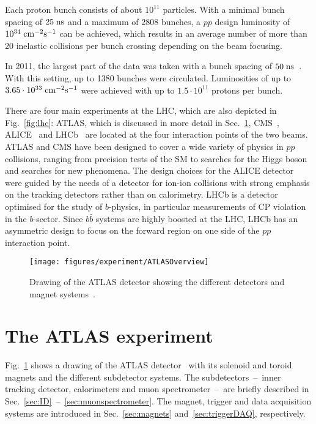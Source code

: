 Each proton bunch consists of about $10^{11}$ particles.
With a minimal bunch spacing of \mbox{$25 \; \mathrm{ns}$} and a maximum of 2808 bunches, a $pp$ design luminosity of \mbox{$10^{34}\; \mathrm{cm}^{-2}\mathrm{s}^{-1}$} can be achieved, 
which results in an average number of more than 20 inelastic collisions per bunch crossing depending on the beam focusing.

In 2011, the largest part of the data was taken with a bunch spacing of \mbox{$50 \; \mathrm{ns}$}~\cite{fournier}.
With this setting, up to 1380 bunches were circulated.
Luminosities of up to \mbox{$3.65 \cdot 10^{33} \; \mathrm{cm}^{-2}\mathrm{s}^{-1}$} were achieved with up to $1.5 \cdot 10^{11}$ protons per bunch.

There are four main experiments at the LHC, which are also depicted in Fig.~\ref{fig:lhc}:
ATLAS, which is discussed in more detail in Sec.~\ref{sec:ATLAS}, CMS~\cite{cms}, ALICE~\cite{alice} and LHCb~\cite{lhcb} 
are located at the four interaction points of the two beams.
ATLAS and CMS have been designed to cover a wide variety of physics in $pp$ collisions, ranging from precision tests of the SM to
searches for the Higgs boson and searches for new phenomena.
The design choices for the ALICE detector were guided by the needs of a detector for ion-ion collisions with strong emphasis on the tracking
detectors rather than on calorimetry.
LHCb is a detector optimised for the study of $b$-physics, in particular measurements of CP violation in the $b$-sector.
Since $b\bar{b}$ systems are highly boosted at the LHC, LHCb has an asymmetric design to focus
on the forward region on one side of the $pp$ interaction point.

\begin{figure}[h]
\begin{center}
\texttt{[image: figures/experiment/ATLASOverview]}
\caption[Drawing of the ATLAS detector]{
  Drawing of the ATLAS detector showing the different detectors and magnet systems~\cite{detectorpaper}.}
\label{fig:ATLAS}
\end{center}
\end{figure}

\section{The ATLAS experiment}
\label{sec:ATLAS}

Fig.~\ref{fig:ATLAS} shows a drawing of the ATLAS detector~\cite{detectorpaper, ATLASTDR} with its solenoid and toroid magnets and the different
subdetector systems.
The subdetectors~--~inner tracking detector, calorimeters and muon spectrometer~--~are briefly described in
Sec.~\ref{sec:ID}~--~\ref{sec:muonspectrometer}.
The magnet, trigger and data acquisition systems are introduced in Sec.~\ref{sec:magnets} and~\ref{sec:triggerDAQ}, respectively.

